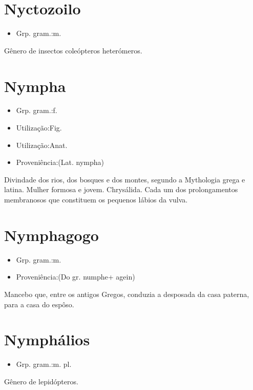 \section{Nyctozoilo}
\begin{itemize}
\item {Grp. gram.:m.}
\end{itemize}
Gênero de insectos coleópteros heterómeros.
\section{Nympha}
\begin{itemize}
\item {Grp. gram.:f.}
\end{itemize}
\begin{itemize}
\item {Utilização:Fig.}
\end{itemize}
\begin{itemize}
\item {Utilização:Anat.}
\end{itemize}
\begin{itemize}
\item {Proveniência:(Lat. \textunderscore nympha\textunderscore )}
\end{itemize}
Divindade dos rios, dos bosques e dos montes, segundo a Mythologia grega e latina.
Mulher formosa e jovem.
Chrysálida.
Cada um dos prolongamentos membranosos que constituem os pequenos lábios da vulva.
\section{Nymphagogo}
\begin{itemize}
\item {Grp. gram.:m.}
\end{itemize}
\begin{itemize}
\item {Proveniência:(Do gr. \textunderscore numphe\textunderscore  + \textunderscore agein\textunderscore )}
\end{itemize}
Mancebo que, entre os antigos Gregos, conduzia a desposada da casa paterna, para a casa do espôso.
\section{Nymphálios}
\begin{itemize}
\item {Grp. gram.:m. pl.}
\end{itemize}
Gênero de lepidópteros.
